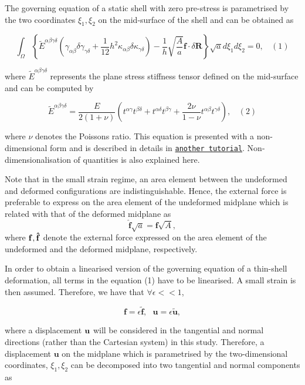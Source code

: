 The governing equation of a static shell with zero pre-\/stress is parametrised by the two coordinates $ \xi_1, \xi_2 $ on the mid-\/surface of the shell and can be obtained as

\[ \int_{\Omega}{\left\{ \tilde{E}^{\alpha\beta\gamma\delta}\left( \gamma_{\alpha\beta}\delta\gamma_{\gamma\delta} + \frac{1}{12}h^2\kappa_{\alpha\beta}\delta\kappa_{\gamma\delta}\right) - \frac{1}{h}\sqrt{\frac{A}{a}}\mathbf{f} \cdotp \delta\mathbf{R}\right\}\sqrt{a}}d\xi_1d\xi_2=0, \ \ \ \ (1) \]

where $ \tilde{E}^{\alpha\beta\gamma\delta} $ represents the plane stress stiffness tensor defined on the mid-\/surface and can be computed by

\[ \tilde{E}^{\alpha\beta\gamma\delta} = \frac{E}{2(1+\nu)}\left( t^{\alpha\gamma}t^{\beta\delta} + t^{\alpha\delta}t^{\beta\gamma} + \frac{2\nu}{1-\nu}t^{\alpha\beta}t^{\gamma\delta}\right), \ \ \ \ (2) \]

where $ \nu $ denotes the Poisson\textquotesingle{}s ratio. This equation is presented with a non-\/dimensional form and is described in details in \href{../../../beam/tensioned_string/html/index.html}{\tt another tutorial}. Non-\/dimensionalisation of quantities is also explained here.

Note that in the small strain regime, an area element between the undeformed and deformed configurations are indistinguishable. Hence, the external force is preferable to express on the area element of the undeformed midplane which is related with that of the deformed midplane as \[ \hat{\mathbf{f}}\sqrt{a} = \mathbf{f}\sqrt{A}, \] where $ \bf{f}, \hat{\bf{f}} $ denote the external force expressed on the area element of the undeformed and the deformed midplane, respectively.

In order to obtain a linearised version of the governing equation of a thin-\/shell deformation, all terms in the equation (1) have to be linearised. A small strain is then assumed. Therefore, we have that $ \forall\epsilon << 1 $,

\[ \mathbf{f} = \epsilon\mathbf{\tilde{f}}, \ \ \ \mathbf{u} = \epsilon\mathbf{\tilde{u}}, \]

where a displacement $ \bf{u} $ will be considered in the tangential and normal directions (rather than the Cartesian system) in this study. Therefore, a displacement $ \mathbf{u} $ on the midplane which is parametrised by the two-\/dimensional coordinates, $ \xi_1, \xi_2 $ can be decomposed into two tangential and normal components as

